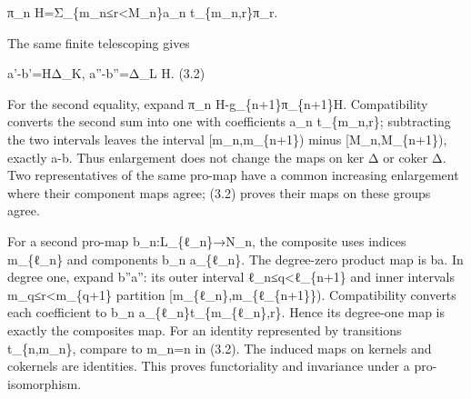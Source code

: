 \documentclass[11pt]{article}
\begin{document}
π\_\allowbreak{}n H\allowbreak{}=Σ\_\allowbreak{}\{m\_\allowbreak{}n≤r<M\_\allowbreak{}n\}a\_\allowbreak{}n t\_\allowbreak{}\{m\_\allowbreak{}n,\allowbreak{}r\}π\_\allowbreak{}r.

The same finite telescoping gives

a'-b'\allowbreak{}=HΔ\_\allowbreak{}K,\allowbreak{} a''-b''\allowbreak{}=Δ\_\allowbreak{}L H. (3.2)\allowbreak{}

For the second equality,\allowbreak{} expand π\_\allowbreak{}n H-g\_\allowbreak{}\{n\allowbreak{}+1\}π\_\allowbreak{}\{n\allowbreak{}+1\}H. Compatibility converts the second sum into one with coefficients a\_\allowbreak{}n t\_\allowbreak{}\{m\_\allowbreak{}n,\allowbreak{}r\}; subtracting the two intervals leaves the interval [m\_\allowbreak{}n,\allowbreak{}m\_\allowbreak{}\{n\allowbreak{}+1\})\allowbreak{} minus [M\_\allowbreak{}n,\allowbreak{}M\_\allowbreak{}\{n\allowbreak{}+1\})\allowbreak{},\allowbreak{} exactly a\textquotesingle\textquotesingle-b\textquotesingle\textquotesingle. Thus enlargement does not change the maps on ker Δ or coker Δ. Two representatives of the same pro-map have a common increasing enlargement where their component maps agree; (3.2)\allowbreak{} proves their maps on these groups agree.

For a second pro-map b\_\allowbreak{}n:\allowbreak{}L\_\allowbreak{}\{ℓ\_\allowbreak{}n\}\allowbreak{}→N\_\allowbreak{}n,\allowbreak{} the composite uses indices m\_\allowbreak{}\{ℓ\_\allowbreak{}n\} and components b\_\allowbreak{}n a\_\allowbreak{}\{ℓ\_\allowbreak{}n\}. The degree-zero product map is b\textquotesingle a\textquotesingle. In degree one,\allowbreak{} expand b''a'':\allowbreak{} its outer interval ℓ\_\allowbreak{}n≤q<ℓ\_\allowbreak{}\{n\allowbreak{}+1\} and inner intervals m\_\allowbreak{}q≤r<m\_\allowbreak{}\{q\allowbreak{}+1\} partition [m\_\allowbreak{}\{ℓ\_\allowbreak{}n\},\allowbreak{}m\_\allowbreak{}\{ℓ\_\allowbreak{}\{n\allowbreak{}+1\}\})\allowbreak{}. Compatibility converts each coefficient to b\_\allowbreak{}n a\_\allowbreak{}\{ℓ\_\allowbreak{}n\}t\_\allowbreak{}\{m\_\allowbreak{}\{ℓ\_\allowbreak{}n\},\allowbreak{}r\}. Hence its degree-one map is exactly the composite\textquotesingle s map. For an identity represented by transitions t\_\allowbreak{}\{n,\allowbreak{}m\_\allowbreak{}n\},\allowbreak{} compare to m\_\allowbreak{}n\allowbreak{}=n in (3.2)\allowbreak{}. The induced maps on kernels and cokernels are identities. This proves functoriality and invariance under a pro-isomorphism.
\end{document}

